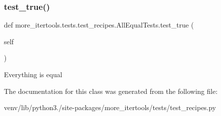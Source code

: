 \subsubsection{\texorpdfstring{test\+\_\+true()}{test\_true()}}
{\footnotesize\ttfamily def more\+\_\+itertools.\+tests.\+test\+\_\+recipes.\+All\+Equal\+Tests.\+test\+\_\+true (\begin{DoxyParamCaption}\item[{}]{self }\end{DoxyParamCaption})}

\begin{DoxyVerb}Everything is equal\end{DoxyVerb}
 

The documentation for this class was generated from the following file\+:\begin{DoxyCompactItemize}
\item 
venv/lib/python3./site-\/packages/more\+\_\+itertools/tests/test\+\_\+recipes.\+py\end{DoxyCompactItemize}
